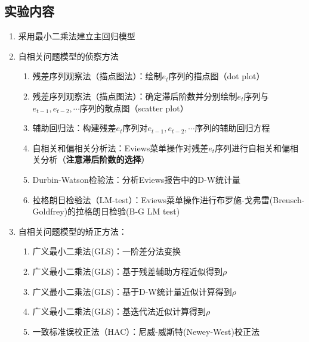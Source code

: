 \documentclass[12pt,(landscape,a4paper),(portrait,a4paper)]{article}
\providecommand{\tightlist}{%
  \setlength{\itemsep}{0pt}\setlength{\parskip}{0pt}}
\theoremstyle{definition}
\theoremstyle{definition}
\theoremstyle{definition}
\theoremstyle{remark}
\begin{document}
\subsection{实验内容}

\begin{enumerate}
\def\labelenumi{\arabic{enumi}.}
\item
  采用最小二乘法建立主回归模型
\item
  自相关问题模型的侦察方法

  \begin{enumerate}
  \def\labelenumii{\alph{enumii}.}
  \tightlist
  \item
    残差序列观察法（描点图法）：绘制\(e_t\)序列的描点图（dot plot）\\
  \item
    残差序列观察法（描点图法）：确定滞后阶数并分别绘制\(e_t\)序列与\({e_{t-1},e_{t-2},\cdots}\)序列的散点图（scatter
    plot）\\
  \item
    辅助回归法：构建残差\(e_t\)序列对\({e_{t-1},e_{t-2},\cdots}\)序列的辅助回归方程\\
  \item
    自相关和偏相关分析法：Eviews菜单操作对残差\(e_t\)序列进行自相关和偏相关分析（\textbf{注意滞后阶数的选择}）
  \item
    Durbin-Watson检验法：分析Eviews报告中的D-W统计量\\
  \item
    拉格朗日检验法（LM-test）：Eviews菜单操作进行布罗施-戈弗雷(Breusch-Goldfrey)的拉格朗日检验(B-G
    LM test)
  \end{enumerate}
\item
  自相关问题模型的矫正方法：

  \begin{enumerate}
  \def\labelenumii{\alph{enumii}.}
  \tightlist
  \item
    广义最小二乘法(GLS)：一阶差分法变换\\
  \item
    广义最小二乘法(GLS)：基于残差辅助方程近似得到\(\rho\)\\
  \item
    广义最小二乘法(GLS)：基于D-W统计量近似计算得到\(\rho\)\\
  \item
    广义最小二乘法(GLS)：基迭代法近似计算得到\(\rho\)
  \item
    一致标准误校正法（HAC）：尼威-威斯特(Newey-West)校正法
  \end{enumerate}
\end{enumerate}
\end{document}
